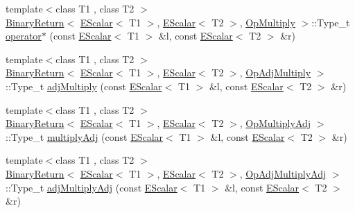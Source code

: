 \begin{DoxyCompactItemize}
\item 
{\footnotesize template$<$class T1 , class T2 $>$ }\\\mbox{\hyperlink{structENSEM_1_1BinaryReturn}{Binary\+Return}}$<$ \mbox{\hyperlink{classENSEM_1_1EScalar}{E\+Scalar}}$<$ T1 $>$, \mbox{\hyperlink{classENSEM_1_1EScalar}{E\+Scalar}}$<$ T2 $>$, \mbox{\hyperlink{structENSEM_1_1OpMultiply}{Op\+Multiply}} $>$\+::Type\+\_\+t \mbox{\hyperlink{group__escalar_ga87a689c2f74aa616bca6523845562c12}{operator$\ast$}} (const \mbox{\hyperlink{classENSEM_1_1EScalar}{E\+Scalar}}$<$ T1 $>$ \&l, const \mbox{\hyperlink{classENSEM_1_1EScalar}{E\+Scalar}}$<$ T2 $>$ \&r)
\item 
{\footnotesize template$<$class T1 , class T2 $>$ }\\\mbox{\hyperlink{structENSEM_1_1BinaryReturn}{Binary\+Return}}$<$ \mbox{\hyperlink{classENSEM_1_1EScalar}{E\+Scalar}}$<$ T1 $>$, \mbox{\hyperlink{classENSEM_1_1EScalar}{E\+Scalar}}$<$ T2 $>$, \mbox{\hyperlink{structENSEM_1_1OpAdjMultiply}{Op\+Adj\+Multiply}} $>$\+::Type\+\_\+t \mbox{\hyperlink{group__escalar_ga8cef36c4e2779c7d7dbf64b9500b053c}{adj\+Multiply}} (const \mbox{\hyperlink{classENSEM_1_1EScalar}{E\+Scalar}}$<$ T1 $>$ \&l, const \mbox{\hyperlink{classENSEM_1_1EScalar}{E\+Scalar}}$<$ T2 $>$ \&r)
\item 
{\footnotesize template$<$class T1 , class T2 $>$ }\\\mbox{\hyperlink{structENSEM_1_1BinaryReturn}{Binary\+Return}}$<$ \mbox{\hyperlink{classENSEM_1_1EScalar}{E\+Scalar}}$<$ T1 $>$, \mbox{\hyperlink{classENSEM_1_1EScalar}{E\+Scalar}}$<$ T2 $>$, \mbox{\hyperlink{structENSEM_1_1OpMultiplyAdj}{Op\+Multiply\+Adj}} $>$\+::Type\+\_\+t \mbox{\hyperlink{group__escalar_ga90260817012914a08b2475f4cc5c94a7}{multiply\+Adj}} (const \mbox{\hyperlink{classENSEM_1_1EScalar}{E\+Scalar}}$<$ T1 $>$ \&l, const \mbox{\hyperlink{classENSEM_1_1EScalar}{E\+Scalar}}$<$ T2 $>$ \&r)
\item 
{\footnotesize template$<$class T1 , class T2 $>$ }\\\mbox{\hyperlink{structENSEM_1_1BinaryReturn}{Binary\+Return}}$<$ \mbox{\hyperlink{classENSEM_1_1EScalar}{E\+Scalar}}$<$ T1 $>$, \mbox{\hyperlink{classENSEM_1_1EScalar}{E\+Scalar}}$<$ T2 $>$, \mbox{\hyperlink{structENSEM_1_1OpAdjMultiplyAdj}{Op\+Adj\+Multiply\+Adj}} $>$\+::Type\+\_\+t \mbox{\hyperlink{group__escalar_gab3c0c146aa415c32cb9ce5a6ad426d10}{adj\+Multiply\+Adj}} (const \mbox{\hyperlink{classENSEM_1_1EScalar}{E\+Scalar}}$<$ T1 $>$ \&l, const \mbox{\hyperlink{classENSEM_1_1EScalar}{E\+Scalar}}$<$ T2 $>$ \&r)

\end{DoxyCompactItemize}
